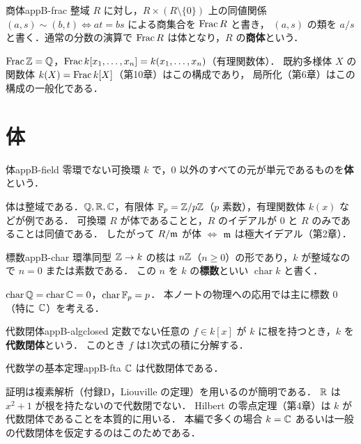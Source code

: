 \begin{mydef}{商体}{appB-frac}
整域 $R$ に対し，$R\times(R\setminus\{0\})$ 上の同値関係 $(a,s)\sim(b,t)\iff at=bs$ による商集合を $\operatorname{Frac} R$ と書き，
$(a,s)$ の類を $a/s$ と書く．通常の分数の演算で $\operatorname{Frac} R$ は体となり，$R$ の\textbf{商体}という．
\end{mydef}

$\operatorname{Frac}\mathbb{Z}=\mathbb{Q}$，$\operatorname{Frac} k[x_1,\dots,x_n]=k(x_1,\dots,x_n)$（有理関数体）．
既約多様体 $X$ の関数体 $k(X)=\operatorname{Frac} k[X]$（第10章）はこの構成であり，
局所化（第6章）はこの構成の一般化である．

\section{体}

\begin{mydef}{体}{appB-field}
零環でない可換環 $k$ で，$0$ 以外のすべての元が単元であるものを\textbf{体}という．
\end{mydef}

体は整域である．$\mathbb{Q},\mathbb{R},\mathbb{C}$，有限体 $\mathbb{F}_p=\mathbb{Z}/p\mathbb{Z}$（$p$ 素数），有理関数体 $k(x)$ などが例である．
可換環 $R$ が体であることと，$R$ のイデアルが $0$ と $R$ のみであることは同値である．
したがって $R/\mathfrak{m}$ が体 $\iff$ $\mathfrak{m}$ は極大イデアル（第2章）．

\begin{mydef}{標数}{appB-char}
環準同型 $\mathbb{Z}\to k$ の核は $n\mathbb{Z}$（$n\geq0$）の形であり，$k$ が整域なので $n=0$ または素数である．
この $n$ を $k$ の\textbf{標数}といい $\operatorname{char}k$ と書く．
\end{mydef}

$\operatorname{char}\mathbb{Q}=\operatorname{char}\mathbb{C}=0$，$\operatorname{char}\mathbb{F}_p=p$．
本ノートの物理への応用では主に標数 $0$（特に $\mathbb{C}$）を考える．

\begin{mydef}{代数閉体}{appB-algclosed}
定数でない任意の $f\in k[x]$ が $k$ に根を持つとき，$k$ を\textbf{代数閉体}という．
このとき $f$ は1次式の積に分解する．
\end{mydef}

\begin{mythm}{代数学の基本定理}{appB-fta}
$\mathbb{C}$ は代数閉体である．
\end{mythm}

証明は複素解析（付録D，Liouville の定理）を用いるのが簡明である．
$\mathbb{R}$ は $x^2+1$ が根を持たないので代数閉でない．
Hilbert の零点定理（第4章）は $k$ が代数閉体であることを本質的に用いる．
本編で多くの場合 $k=\mathbb{C}$ あるいは一般の代数閉体を仮定するのはこのためである．

